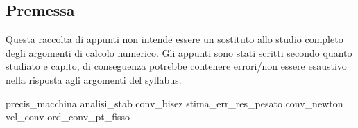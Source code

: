 \documentclass[12pt,a4paper,headings=optiontohead]{article}
\begin{document}
\begin{center}
\pagebreak

\section*{Premessa}
\begin{minipage}{0.9\textwidth} \large

Questa raccolta di appunti non intende essere un sostituto allo studio completo degli argomenti di calcolo numerico. Gli appunti sono stati scritti secondo quanto studiato e capito, di conseguenza potrebbe contenere errori/non essere esaustivo nella risposta agli argomenti del syllabus.

\end{minipage}

\end{center}
\pagebreak


\tableofcontents

\newpage
{precis_macchina}
\newpage
{analisi_stab}
{conv_bisez}
\newpage
{stima_err_res_pesato}
\newpage
{conv_newton}
\newpage
{vel_conv}
\newpage
{ord_conv_pt_fisso}
\end{document}
